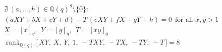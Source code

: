 \documentclass{article}
\begin{document}
\[
\begin{aligned}
&\nexists\ (a,\dots,h)\in\mathbb{Q}(q)^{8}\setminus\{0\}:\\
&(aXY+bX+cY+d)-T\,(eXY+fX+gY+h)=0\ \ \text{for all }x,y>1\\
&X=[x]_q,\ \ Y=[y]_q,\ \ T=[xy]_q\\
&\operatorname{rank}_{\mathbb{Q}(q)}\bigl[\,XY,\ X,\ Y,\ 1,\ -TXY,\ -TX,\ -TY,\ -T\,\bigr]=8
\end{aligned}
\]
\end{document}
